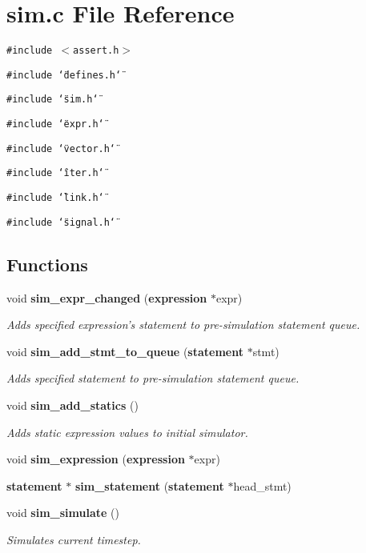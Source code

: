 \section{sim.c File Reference}
\label{sim_8c}
{\tt \#include $<$assert.h$>$}\par
{\tt \#include \char`\"{}defines.h\char`\"{}}\par
{\tt \#include \char`\"{}sim.h\char`\"{}}\par
{\tt \#include \char`\"{}expr.h\char`\"{}}\par
{\tt \#include \char`\"{}vector.h\char`\"{}}\par
{\tt \#include \char`\"{}iter.h\char`\"{}}\par
{\tt \#include \char`\"{}link.h\char`\"{}}\par
{\tt \#include \char`\"{}signal.h\char`\"{}}\par
\subsection*{Functions}
\begin{CompactItemize}
\item 
void {\bf sim\_\-expr\_\-changed} ({\bf expression} $\ast$expr)
\begin{CompactList}\small\item\em Adds specified expression's statement to pre-simulation statement queue. \item\end{CompactList}\item 
void {\bf sim\_\-add\_\-stmt\_\-to\_\-queue} ({\bf statement} $\ast$stmt)
\begin{CompactList}\small\item\em Adds specified statement to pre-simulation statement queue. \item\end{CompactList}\item 
void {\bf sim\_\-add\_\-statics} ()
\begin{CompactList}\small\item\em Adds static expression values to initial simulator. \item\end{CompactList}\item 
void {\bf sim\_\-expression} ({\bf expression} $\ast$expr)
\item 
{\bf statement} $\ast$ {\bf sim\_\-statement} ({\bf statement} $\ast$head\_\-stmt)
\item 
void {\bf sim\_\-simulate} ()
\begin{CompactList}\small\item\em Simulates current timestep. \item\end{CompactList}\end{CompactItemize}
